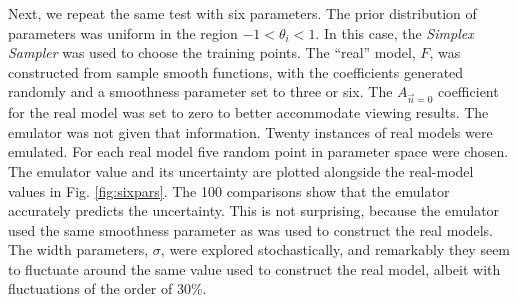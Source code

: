 \documentclass[main.tex]{subfiles}
\begin{document}
Next, we repeat the same test with six parameters. The prior distribution of parameters was uniform in the region $-1<\theta_i<1$. In this case, the {\it Simplex Sampler} was used to choose the training points. The ``real'' model, $F$, was constructed from sample smooth functions, with the coefficients generated randomly and a smoothness parameter set to three or six. The $A_{\vec{n}=0}$ coefficient for the real model was set to zero to better accommodate viewing results. The emulator was not given that information. Twenty instances of real models were emulated. For each real model five random point in parameter space were chosen. The emulator value and its uncertainty are plotted alongside the real-model values in Fig. \ref{fig:sixpars}. The 100 comparisons show that the emulator accurately predicts the uncertainty. This is not surprising, because the emulator used the same smoothness parameter as was used to construct the real models. The width parameters, $\sigma$, were explored stochastically, and remarkably they seem to fluctuate around the same value used to construct the real model, albeit with fluctuations of the order of 30\%. 
\end{document}
